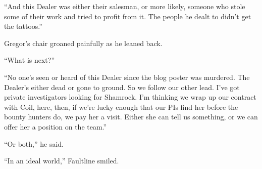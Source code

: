 ``And this Dealer was either their salesman, or more likely, someone who stole some of their work and tried to profit from it.  The people he dealt to didn't get the tattoos.''



Gregor's chair groaned painfully as he leaned back.



``What is next?''



``No one's seen or heard of this Dealer since the blog poster was murdered.  The Dealer's either dead or gone to ground.  So we follow our other lead.  I've got private investigators looking for Shamrock.  I'm thinking we wrap up our contract with Coil, here, then, if we're lucky enough that our PIs find her before the bounty hunters do, we pay her a visit. Either she can tell us something, or we can offer her a position on the team.''



``Or both,'' he said.



``In an ideal world,'' Faultline smiled.





